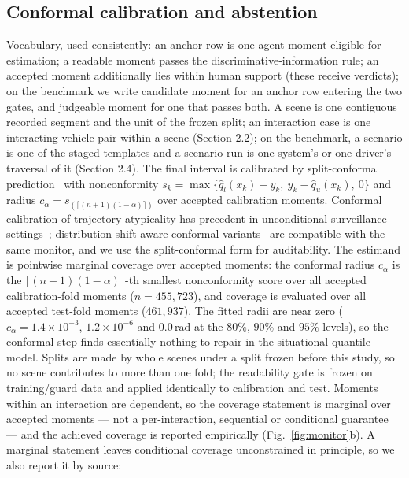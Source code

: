 \documentclass[12pt,a4paper]{article}
\begin{document}
\subsection{Conformal calibration and abstention}
Vocabulary, used consistently: an anchor row is one agent-moment eligible for
estimation; a readable moment passes the discriminative-information rule; an accepted moment
additionally lies within human support (these receive verdicts); on the benchmark we write candidate
moment for an anchor row entering the two gates, and judgeable moment for one that passes both. A scene
is one contiguous recorded segment and the unit of the frozen split; an interaction case is one
interacting vehicle pair within a scene (Section 2.2); on the benchmark, a scenario is one of the staged
templates and a scenario run is one system's or one driver's traversal of it (Section 2.4).
The final interval is calibrated by split-conformal prediction~\cite{romano2019cqr,angelopoulos2023conformal} with nonconformity
$s_k=\max\{\hat q_l(x_k)-y_k,\ y_k-\hat q_u(x_k),\ 0\}$ and radius
$c_\alpha=s_{(\lceil(n+1)(1-\alpha)\rceil)}$ over accepted calibration moments.
Conformal calibration of trajectory atypicality has precedent in unconditional surveillance
settings~\cite{laxhammar2014online}; distribution-shift-aware conformal
variants~\cite{tibshirani2019conformal, gibbs2021adaptive, lei2018distribution} are compatible with
the same monitor, and we use the split-conformal form for auditability.
The estimand is pointwise marginal coverage over accepted moments: the conformal radius $c_\alpha$
is the $\lceil(n+1)(1-\alpha)\rceil$-th smallest nonconformity score over all accepted
calibration-fold moments ($n=455{,}723$), and coverage is evaluated over all accepted test-fold
moments ($461{,}937$). The fitted radii are near zero ($c_\alpha = 1.4\times10^{-3}$, $1.2\times10^{-6}$ and $0.0$\,rad at the $80\%$, $90\%$ and $95\%$ levels), so the conformal step finds essentially nothing to repair in the situational quantile model.
Splits are made by whole scenes under a split frozen before this study, so no
scene contributes to more than one fold; the readability gate is frozen on training/guard data and
applied identically to calibration and test. Moments within an interaction are dependent, so the
coverage statement is marginal over accepted moments --- not a per-interaction, sequential or
conditional guarantee --- and the achieved coverage is reported empirically (Fig.~\ref{fig:monitor}b). A marginal
statement leaves conditional coverage unconstrained in principle, so we also report it by source:
\end{document}
